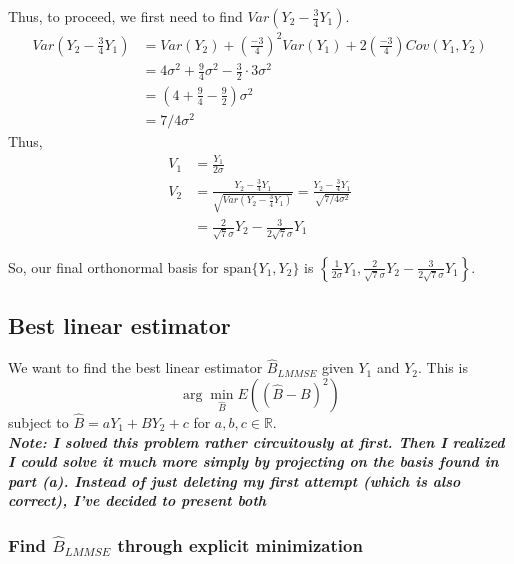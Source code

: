 \documentclass[paper=a4, fontsize=11pt]{scrartcl} %
\numberwithin{equation}{section} %
\numberwithin{figure}{section} %
\numberwithin{table}{section} %
\begin{document}
Thus, to proceed, we first need to find $Var(Y_2 - \frac{ 3}{4}Y_1)$.
\begin{align*}
Var\left(Y_2 - \frac{ 3}{4}Y_1\right) &= Var(Y_2) + \left(\frac{-3}{4}\right)^2 Var(Y_1) + 2 \left(\frac{-3}{4}\right) Cov(Y_1,Y_2)\\
   &= 4 \sigma^2 + \frac{9}{4}\sigma^2 - \frac{3}{2} \cdot 3 \sigma^2 \\
   &= \left(4 + \frac{9}{4} - \frac{9}{2}\right) \sigma^2 \\
   &= 7/4 \sigma^2
\end{align*}
Thus, 
\begin{align*}
V_1 &=  \frac{Y_1}{2\sigma} \\
V_2 &= \frac{Y_2 - \frac{ 3}{4}Y_1}{\sqrt{Var(Y_2 - \frac{ 3}{4}Y_1)}} = \frac{Y_2 - \frac{ 3}{4}Y_1}{\sqrt{7/4 \sigma^2}} \\
   &= \frac{2}{\sqrt{7}\sigma} Y_2 - \frac{3}{2\sqrt{7}\sigma}Y_1
\end{align*}

So, our final orthonormal basis for $\textrm{span}\{Y_1, Y_2\}$ is $\left\{\frac{1}{2\sigma}Y_1, \frac{2}{\sqrt{7}\sigma} Y_2 - \frac{3}{2\sqrt{7}\sigma}Y_1\right\}$.

\subsection{Best linear estimator}

We want to find the best linear estimator $\hat{B}_{LMMSE}$ given $Y_1$ and $Y_2$. This is
\[ \arg \min_{\hat{B}} E\left( (\hat{B} - B)^2 \right) \]
subject to $ \hat{B} = aY_1 + BY_2 + c$ for $a, b, c \in \mathbb{R}$.\\

\textbf{\emph{Note: I solved this problem rather circuitously at first. Then I realized I could solve it much more simply by projecting on the basis found in part (a). Instead of just deleting my first attempt (which is also correct), I've decided to present both}}

\subsubsection{Find $\hat{B}_{LMMSE}$ through explicit minimization}
\end{document}
